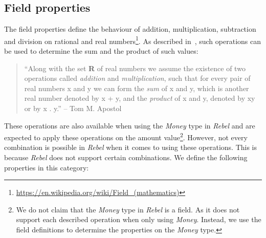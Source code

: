 \subsection{Field properties}
\label{ssct:properties_definitions_fieldproperties}
The field properties define the behaviour of addition, multiplication, subtraction and division on rational and real numbers\footnote{\url{https://en.wikipedia.org/wiki/Field_(mathematics)}}. As described
in~\cite{apostol2007calculus}, such operations can be used to determine the sum and the product of such values:
\begin{quote}
	``Along with the set \textbf{R} of real numbers we assume the existence of two operations called
	\textit{addition} and \textit{multiplication}, such that for every pair of real numbers x and y we can form the
	\textit{sum} of x and y, which is another real number denoted by x + y, and the \textit{product} of x and y,
	denoted by xy or by x . y.''
	-- Tom M. Apostol~\cite{apostol2007calculus}
\end{quote}
These operations are also available
when using the \textit{Money} type in \textit{Rebel} and are expected to apply
these operations on the amount value\footnote{We do not claim that the \textit{Money} type in \textit{Rebel} is a field. As it does not support each described operation when only using \textit{Money}. Instead, we use the field definitions to determine the properties on the \textit{Money} type.}. However, not every combination is possible
in \textit{Rebel} when it comes to using these operations. This is because \textit{Rebel} does not support certain combinations. We define the following properties in this category:

